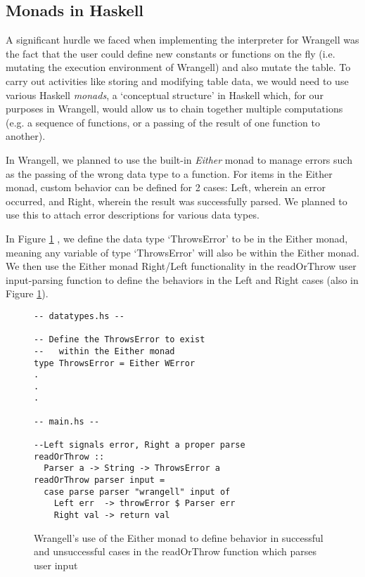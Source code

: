 \documentclass[preprint,nocopyrightspace]{sig-alternate}
\begin{document}
\twocolumn

\begin{comment}
TODO: update code segments and big-step semantics and syntax of wrangell
\end{comment}


\subsection{Monads in Haskell}



A significant hurdle we faced when implementing the interpreter for Wrangell was the fact that the user could define new constants or functions on the fly (i.e. mutating the execution environment of Wrangell) and also mutate the table. To carry out activities like storing and modifying table data, we would need to use various Haskell \emph{monads}, a `conceptual structure' \cite{gentleMonads} in Haskell which, for our purposes in Wrangell, would allow us to chain together multiple computations (e.g. a sequence of functions, or a passing of the result of one function to another).

In Wrangell, we planned to use the built-in \emph{Either} monad to manage errors such as the passing of the wrong data type to a function. For items in the Either monad, custom behavior can be defined for 2 cases: Left, wherein an error occurred, and Right, wherein the result was successfully parsed. We planned to use this to attach error descriptions for various data types.  

In Figure \ref{eitherThrowError0} , we define the data type `ThrowsError' to be in the Either monad, meaning any variable of type `ThrowsError' will also be within the Either monad. We then use the Either monad Right/Left functionality in the readOrThrow user input-parsing function to define the behaviors in the Left and Right cases (also in Figure \ref{eitherThrowError0}).

\begin{figure}
\begin{lstlisting}
-- datatypes.hs --

-- Define the ThrowsError to exist 
--   within the Either monad
type ThrowsError = Either WError
.
.
.

-- main.hs --

--Left signals error, Right a proper parse
readOrThrow :: 
  Parser a -> String -> ThrowsError a
readOrThrow parser input = 
  case parse parser "wrangell" input of
    Left err  -> throwError $ Parser err
    Right val -> return val 

\end{lstlisting}
\caption{Wrangell's use of the Either monad to define behavior in successful and unsuccessful cases in the readOrThrow function which parses user input}
\label{eitherThrowError0}
\end{figure}
\end{document}
